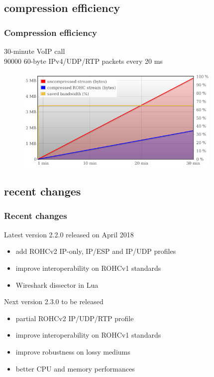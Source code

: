 \documentclass[utf8]{beamer}
\begin{document}
\subsection{compression efficiency}
\begin{frame}
	\frametitle{Compression efficiency}
	30-minute VoIP call\\
	{\tiny 90000 60-byte IPv4/UDP/RTP packets every 20 ms}
	\begin{figure}
		\includegraphics[height=50mm]{images/rohc_perfs.png}
	\end{figure}
\end{frame}

\subsection{recent changes}
\begin{frame}
	\frametitle{Recent changes}
	\begin{block}{Latest version 2.2.0 released on April 2018}
		\begin{itemize}
			\item add ROHCv2 IP-only, IP/ESP and IP/UDP profiles
			\item improve interoperability on ROHCv1 standards
			\item Wireshark dissector in Lua
		\end{itemize}
	\end{block}
	\pause
	\begin{block}{Next version 2.3.0 to be released}
		\begin{itemize}
			\item partial ROHCv2 IP/UDP/RTP profile
			\item improve interoperability on ROHCv1 standards
			\item improve robustness on lossy mediums
			\item better CPU and memory performances
		\end{itemize}
	\end{block}
\end{frame}
\end{document}
